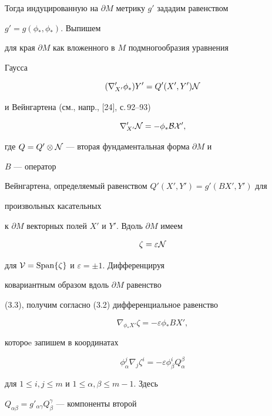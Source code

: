 Тогда индуцированную на $\partial M$ метрику $g'$ зададим равенством 


$g'=g(\phi_*,\phi_*)$. Выпишем 


для края $\partial M$ как вложенного в $M$ подмногообразия уравнения 


Гаусса 


$$ 


(\nabla'_{X'}\phi_*)Y'=Q'(X',Y')\cal N 


$$ 


и Вейнгартена (см., напр., [24], с.\,92--93) 


\begin{equation} 


\nabla'_{X'}\cal N=-\phi_*B X', 


\end{equation} 


где $Q=Q'\otimes\cal N$ --- вторая фундаментальная форма $\partial M$ и 


$B$ --- оператор 


Вейнгартена, определяемый равенством $Q'(X',Y')=g'(B X',Y')$ для 


произвольных касательных 


к $\partial M$ векторных полей $X'$ и $Y'$. Вдоль $\partial M$ имеем 


\begin{equation} 


\zeta=\varepsilon\cal N 


\end{equation} 


для $\cal V=\operatorname{Span}\{\zeta\}$ и $\varepsilon=\pm 1$. Дифференцируя 


ковариантным образом вдоль $\partial M$ равенство 


(3.3), получим согласно (3.2) дифференциальное равенство 


$$ 


\nabla_{\phi_*X'}\zeta=-\varepsilon\phi_*B X', 


$$ 


котороe запишем в координатах


\begin{equation} 


\phi^j_\alpha\nabla_j\zeta^i=-\varepsilon\phi^i_\beta Q^\beta_\alpha 


\end{equation} 


для $1\le i,j\le m$ и $1\le\alpha,\beta\le m-1$. Здесь 


$Q_{\alpha\beta}=g'_{\alpha\gamma}Q^\gamma_\beta$ --- компоненты второй 


